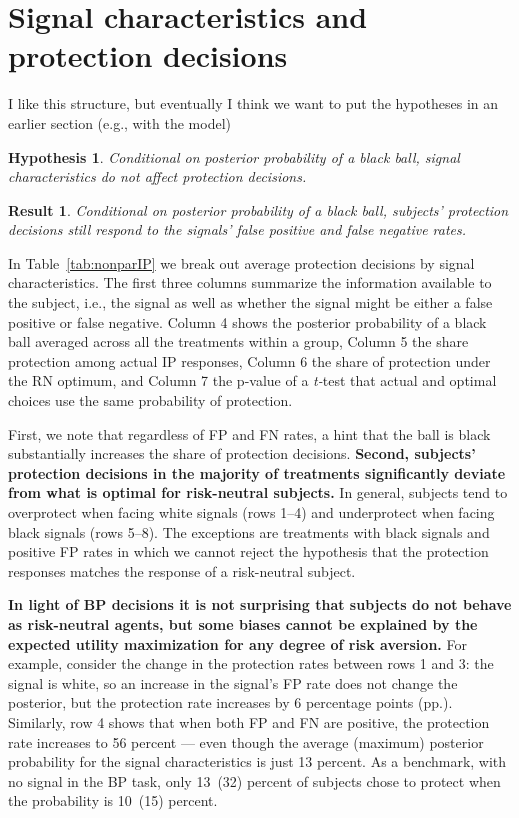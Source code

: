 \documentclass[12pt,a4paper]{article}
\newcommand{\pmt}[1]{{\color{Blue}#1}}
\newtheorem{hypothesis}{Hypothesis}
\newtheorem{result}{Result}
\begin{document}
\section{Signal characteristics and protection decisions} 
\pmt{I like this structure, but eventually I think we want to put the hypotheses in an earlier section (e.g., with the model)}
\begin{hypothesis} Conditional on posterior probability of a black ball, signal characteristics do not affect protection decisions. \end{hypothesis}
\begin{result}\label{res:IPdeviations} %
Conditional on posterior probability of a black ball, subjects' protection decisions still respond to the signals' false positive and false negative rates. \end{result}

In Table~\ref{tab:nonparIP} we break out average protection decisions by signal characteristics. The first three columns summarize the information available to the subject, i.e., the signal as well as whether the signal might be either a false positive or false negative. Column 4 shows the posterior probability of a black ball averaged across all the treatments within a group, Column 5 the share protection among actual IP responses, Column 6 the share of protection under the RN optimum, and Column 7 the p-value of a \emph{t-}test that actual and optimal choices use the same probability of protection.

First, we note that regardless of FP and FN rates, a hint that the ball is black substantially increases the share of protection decisions.  \textbf{Second, subjects' protection decisions in the majority of treatments significantly deviate from what is optimal for risk-neutral subjects.}  In general, subjects tend to overprotect when facing white signals (rows 1--4) and underprotect when facing black signals (rows 5--8). The exceptions are treatments with black signals and positive FP rates in which we cannot reject the hypothesis that the protection responses matches the response of a risk-neutral subject. 

\textbf{In light of BP decisions it is not surprising that subjects do not behave as risk-neutral agents, but some biases cannot be explained by the expected utility maximization for any degree of risk aversion.} For example, consider the change in the protection rates between rows 1 and 3: the signal is white, so an increase in the signal's FP rate does not change the posterior, but the protection rate increases by 6 percentage points (pp.). Similarly, row 4 shows that when both FP and FN are positive, the protection rate increases to 56 percent --- even though the average (maximum) posterior probability for the signal characteristics is just 13 percent. As a benchmark, with no signal in the BP task, only 13~(32) percent of subjects chose to protect when the probability is 10~(15) percent. 
\end{document}
